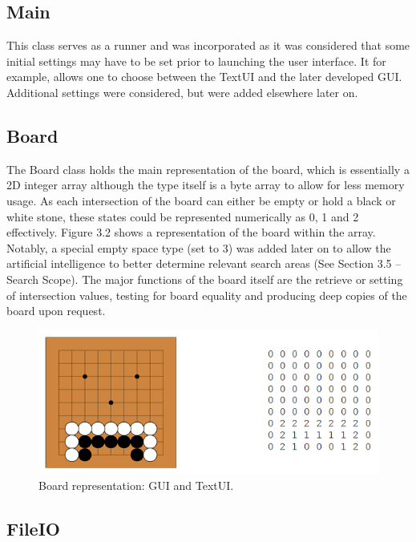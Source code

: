 \documentclass{l3proj}
\begin{document}
\subsection{Main}

This class serves as a runner and was incorporated as it was considered that some initial settings may have to be set prior to launching the user interface. It for example, allows one to choose between the TextUI and the later developed GUI. Additional settings were considered, but were added elsewhere later on.

\subsection{Board}

The Board class holds the main representation of the board, which is essentially a 2D integer array although the type itself is a byte array to allow for less memory usage. As each intersection of the board can either be empty or hold a black or white stone, these states could be represented numerically as 0, 1 and 2 effectively. Figure 3.2 shows a representation of the board within the array. Notably, a special empty space type (set to 3) was added later on to allow the artificial intelligence to better determine relevant search areas (See Section 3.5 – Search Scope). The major functions of the board itself are the retrieve or setting of intersection values, testing for board equality and producing deep copies of the board upon request. 

\begin{figure}[H]
\centering
\includegraphics[scale=1]{Images/GE-BoardRep.png}
\caption{Board representation: GUI and TextUI.}
\end{figure}

\subsection{FileIO}
\end{document}
